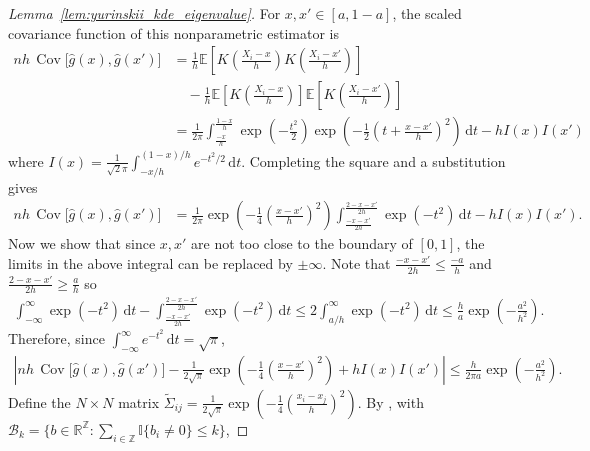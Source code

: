 \documentclass[11pt,lof]{puthesis}
\newcommand{\R}{\ensuremath{\mathbb{R}}}
\newcommand{\E}{\ensuremath{\mathbb{E}}}
\newcommand{\I}{\ensuremath{\mathbb{I}}}
\newcommand{\Z}{\ensuremath{\mathbb{Z}}}
\newcommand{\cB}{\ensuremath{\mathcal{B}}}
\DeclareMathOperator{\Cov}{Cov}
\newcommand{\diff}[1]{\,\mathrm{d}#1}
\theoremstyle{break}
\theoremstyle{proof}
\newtheorem{proof}{Proof}
\begin{document}
\begin{proof}[Lemma~\ref{lem:yurinskii_kde_eigenvalue}]

For $x, x' \in [a, 1-a]$, the scaled covariance function
of this nonparametric estimator is
%
\begin{align*}
n h\, \Cov\big[\hat g(x), \hat g(x')\big]
&=
\frac{1}{h}
\E \left[
K \left( \frac{X_i - x}{h} \right)
K \left( \frac{X_i - x'}{h} \right)
\right] \\
&\quad-
\frac{1}{h}
\E \left[
K \left( \frac{X_i - x}{h} \right)
\right]
\E \left[
K \left( \frac{X_i - x'}{h} \right)
\right] \\
&=
\frac{1}{2 \pi}
\int_{\frac{-x}{h}}^{\frac{1-x}{h}}
\exp \left( - \frac{t^2}{2} \right)
\exp \left( - \frac{1}{2} \left( t + \frac{x - x'}{h} \right)^2 \right)
\diff t
- h I(x) I(x')
\end{align*}
%
where
$I(x) = \frac{1}{\sqrt 2 \pi} \int_{-x/h}^{(1-x)/h} e^{-t^2/2} \diff t$.
Completing the square and a substitution gives
%
\begin{align*}
n h\, \Cov\big[\hat g(x), \hat g(x')\big]
&=
\frac{1}{2 \pi}
\exp \left( - \frac{1}{4} \left( \frac{x-x'}{h} \right)^2 \right)
\int_{\frac{-x-x'}{2h}}^{\frac{2-x-x'}{2h}}
\exp \left(-t^2\right)
\diff t
- h I(x) I(x').
\end{align*}
%
Now we show that since $x, x'$ are not too close to the boundary
of $[0,1]$,
the limits in the above integral can be replaced by $\pm \infty$.
Note that $\frac{-x-x'}{2h} \leq \frac{-a}{h}$
and $\frac{2-x-x'}{2h} \geq \frac{a}{h}$ so
%
\begin{align*}
\int_{-\infty}^{\infty}
\exp \left(-t^2\right)
\diff t
- \int_{\frac{-x-x'}{2h}}^{\frac{2-x-x'}{2h}}
\exp \left(-t^2\right)
\diff t
\leq
2 \int_{a/h}^\infty
\exp \left(-t^2\right)
\diff t
\leq
\frac{h}{a}
\exp \left(- \frac{a^2}{h^2}\right).
\end{align*}
%
Therefore, since
$\int_{-\infty}^{\infty} e^{-t^2} \diff t = \sqrt \pi$,
%
\begin{align*}
\left|
n h\, \Cov\big[\hat g(x), \hat g(x')\big]
- \frac{1}{2 \sqrt \pi}
\exp \left( - \frac{1}{4} \left( \frac{x-x'}{h} \right)^2 \right)
+ h I(x) I(x')
\right|
\leq
\frac{h}{2 \pi a}
\exp \left(- \frac{a^2}{h^2}\right).
\end{align*}
%
Define the $N \times N$ matrix
$\tilde\Sigma_{i j} = \frac{1}{2 \sqrt \pi}
\exp \left( - \frac{1}{4} \left( \frac{x_i-x_j}{h} \right)^2 \right)$.
By \citet[Proposition~2.4,
Proposition~2.5, and Equation~2.10]{baxter1994norm},
with
$\cB_k = \big\{b \in \R^\Z :
\sum_{i \in \Z} \I\{b_i \neq 0\} \leq k \big\}$,

\end{proof}
\end{document}
